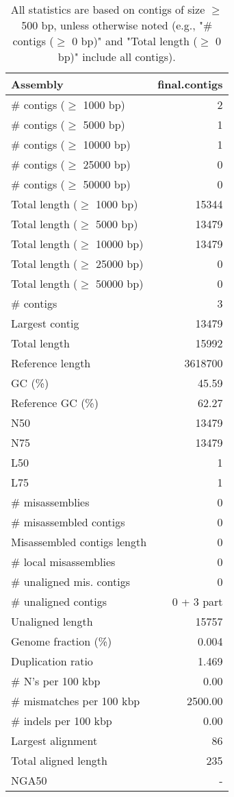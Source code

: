 \documentclass[12pt,a4paper]{article}
\begin{document}
\begin{table}[ht]
\begin{center}
\caption{All statistics are based on contigs of size $\geq$ 500 bp, unless otherwise noted (e.g., "\# contigs ($\geq$ 0 bp)" and "Total length ($\geq$ 0 bp)" include all contigs).}
\begin{tabular}{|l*{1}{|r}|}
\hline
Assembly & final.contigs \\ \hline
\# contigs ($\geq$ 1000 bp) & 2 \\ \hline
\# contigs ($\geq$ 5000 bp) & 1 \\ \hline
\# contigs ($\geq$ 10000 bp) & 1 \\ \hline
\# contigs ($\geq$ 25000 bp) & 0 \\ \hline
\# contigs ($\geq$ 50000 bp) & 0 \\ \hline
Total length ($\geq$ 1000 bp) & 15344 \\ \hline
Total length ($\geq$ 5000 bp) & 13479 \\ \hline
Total length ($\geq$ 10000 bp) & 13479 \\ \hline
Total length ($\geq$ 25000 bp) & 0 \\ \hline
Total length ($\geq$ 50000 bp) & 0 \\ \hline
\# contigs & 3 \\ \hline
Largest contig & 13479 \\ \hline
Total length & 15992 \\ \hline
Reference length & 3618700 \\ \hline
GC (\%) & 45.59 \\ \hline
Reference GC (\%) & 62.27 \\ \hline
N50 & 13479 \\ \hline
N75 & 13479 \\ \hline
L50 & 1 \\ \hline
L75 & 1 \\ \hline
\# misassemblies & 0 \\ \hline
\# misassembled contigs & 0 \\ \hline
Misassembled contigs length & 0 \\ \hline
\# local misassemblies & 0 \\ \hline
\# unaligned mis. contigs & 0 \\ \hline
\# unaligned contigs & 0 + 3 part \\ \hline
Unaligned length & 15757 \\ \hline
Genome fraction (\%) & 0.004 \\ \hline
Duplication ratio & 1.469 \\ \hline
\# N's per 100 kbp & 0.00 \\ \hline
\# mismatches per 100 kbp & 2500.00 \\ \hline
\# indels per 100 kbp & 0.00 \\ \hline
Largest alignment & 86 \\ \hline
Total aligned length & 235 \\ \hline
NGA50 & - \\ \hline
\end{tabular}
\end{center}
\end{table}
\end{document}
